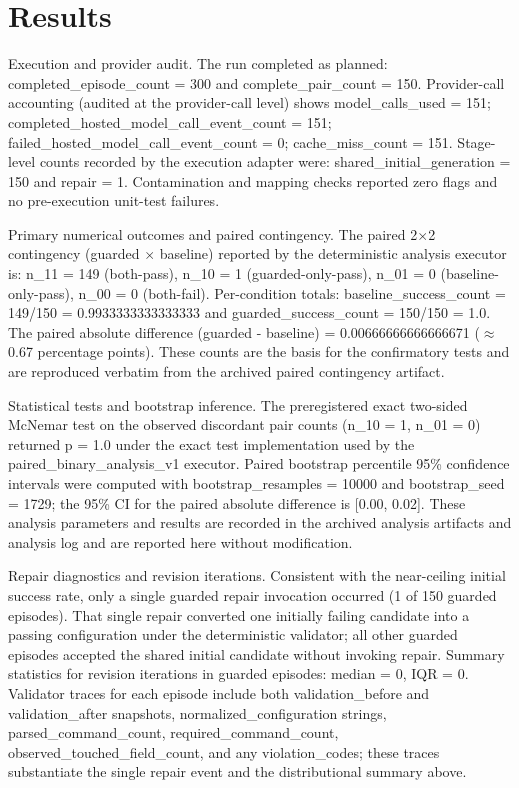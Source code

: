 \documentclass[conference]{IEEEtran}
\begin{document}
\section{Results}
Execution and provider audit. The run completed as planned: completed\_episode\_count = 300 and complete\_pair\_count = 150. Provider-call accounting (audited at the provider-call level) shows model\_calls\_used = 151; completed\_hosted\_model\_call\_event\_count = 151; failed\_hosted\_model\_call\_event\_count = 0; cache\_miss\_count = 151. Stage-level counts recorded by the execution adapter were: shared\_initial\_generation = 150 and repair = 1. Contamination and mapping checks reported zero flags and no pre-execution unit-test failures.

Primary numerical outcomes and paired contingency. The paired 2\ensuremath{\times}2 contingency (guarded \ensuremath{\times} baseline) reported by the deterministic analysis executor is: n\_11 = 149 (both-pass), n\_10 = 1 (guarded-only-pass), n\_01 = 0 (baseline-only-pass), n\_00 = 0 (both-fail). Per-condition totals: baseline\_success\_count = 149/150 = 0.9933333333333333 and guarded\_success\_count = 150/150 = 1.0. The paired absolute difference (guarded - baseline) = 0.00666666666666671 (\ensuremath{\approx}0.67 percentage points). These counts are the basis for the confirmatory tests and are reproduced verbatim from the archived paired contingency artifact.

Statistical tests and bootstrap inference. The preregistered exact two-sided McNemar test on the observed discordant pair counts (n\_10 = 1, n\_01 = 0) returned p = 1.0 under the exact test implementation used by the paired\_binary\_analysis\_v1 executor. Paired bootstrap percentile 95\% confidence intervals were computed with bootstrap\_resamples = 10000 and bootstrap\_seed = 1729; the 95\% CI for the paired absolute difference is [0.00, 0.02]. These analysis parameters and results are recorded in the archived analysis artifacts and analysis log and are reported here without modification.

Repair diagnostics and revision iterations. Consistent with the near-ceiling initial success rate, only a single guarded repair invocation occurred (1 of 150 guarded episodes). That single repair converted one initially failing candidate into a passing configuration under the deterministic validator; all other guarded episodes accepted the shared initial candidate without invoking repair. Summary statistics for revision iterations in guarded episodes: median = 0, IQR = 0. Validator traces for each episode include both validation\_before and validation\_after snapshots, normalized\_configuration strings, parsed\_command\_count, required\_command\_count, observed\_touched\_field\_count, and any violation\_codes; these traces substantiate the single repair event and the distributional summary above.
\end{document}
